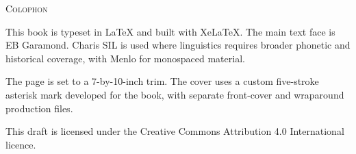 \clearpage
\thispagestyle{empty}
\vspace*{\fill}

\begin{center}
\small
\textsc{Colophon}

\vspace{1em}

\begin{minipage}{0.78\textwidth}
\small
\raggedright
\setlength{\parindent}{0pt}
\setlength{\parskip}{0.6\baselineskip}
This book is typeset in \LaTeX{} and built with XeLaTeX. The main text
face is EB Garamond. Charis SIL is used where linguistics requires
broader phonetic and historical coverage, with Menlo for monospaced
material.

The page is set to a 7-by-10-inch trim. The cover uses a custom
five-stroke asterisk mark developed for the book, with separate front-cover
and wraparound production files.

This draft is licensed under the Creative Commons Attribution 4.0
International licence.
\end{minipage}
\end{center}

\vspace*{\fill}
\clearpage
